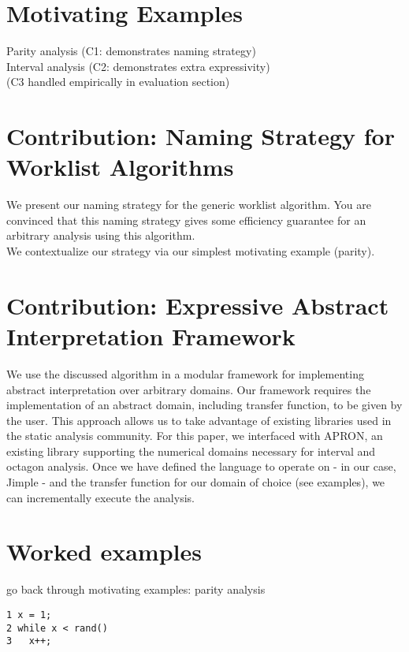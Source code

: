 \documentclass[acmlarge,anonymous]{acmart}\settopmatter{printfolios=true}
\begin{document}
\section{Motivating Examples}

Parity analysis (C1: demonstrates naming strategy)\\
Interval analysis (C2: demonstrates extra expressivity)\\
(C3 handled empirically in evaluation section)

\section{Contribution: Naming Strategy for Worklist Algorithms}

We present our naming strategy for the generic worklist algorithm. You are convinced that this naming strategy gives some efficiency guarantee for an arbitrary analysis using this algorithm.\\

We contextualize our strategy via our simplest motivating example (parity).

\section{Contribution: Expressive Abstract Interpretation Framework}

We use the discussed algorithm in a modular framework for implementing abstract interpretation over arbitrary domains. Our framework requires the implementation of an abstract domain, including transfer function, to be given by the user. This approach allows us to take advantage of existing libraries used in the static analysis community. For this paper, we interfaced with APRON, an existing library supporting the numerical domains necessary for interval and octagon analysis. Once we have defined the language to operate on - in our case, Jimple - and the transfer function for our domain of choice (see examples), we can incrementally execute the analysis.

\section{Worked examples}

go back through motivating examples: parity analysis

\begin{lstlisting}
1 x = 1;
2 while x < rand()
3   x++;
\end{lstlisting}
\end{document}
